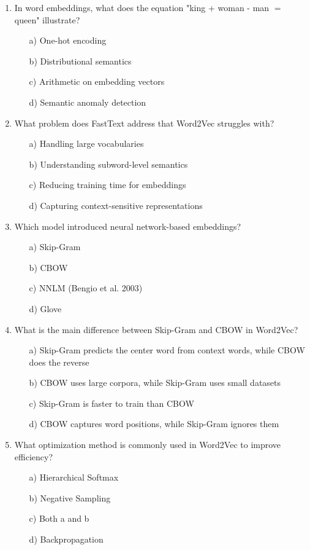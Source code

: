 \documentclass[8pt]{extarticle}
\begin{document}
\begin{multicols}{2}
\begin{enumerate}
\item In word embeddings, what does the equation "king + woman - man $=$ queen" illustrate?
\begin{itemize}
\item[a)] One-hot encoding
\item[b)] Distributional semantics
\item[c)] Arithmetic on embedding vectors
\item[d)] Semantic anomaly detection
\end{itemize}

\item What problem does FastText address that Word2Vec struggles with?
\begin{itemize}
\item[a)] Handling large vocabularies
\item[b)] Understanding subword-level semantics
\item[c)] Reducing training time for embeddings
\item[d)] Capturing context-sensitive representations
\end{itemize}

\item Which model introduced neural network-based embeddings?
\begin{itemize}
\item[a)] Skip-Gram
\item[b)] CBOW
\item[c)] NNLM (Bengio et al. 2003)
\item[d)] Glove
\end{itemize}

\item What is the main difference between Skip-Gram and CBOW in Word2Vec?
\begin{itemize}
\item[a)] Skip-Gram predicts the center word from context words, while CBOW does the reverse
\item[b)] CBOW uses large corpora, while Skip-Gram uses small datasets
\item[c)] Skip-Gram is faster to train than CBOW
\item[d)] CBOW captures word positions, while Skip-Gram ignores them
\end{itemize}

\item What optimization method is commonly used in Word2Vec to improve efficiency?
\begin{itemize}
\item[a)] Hierarchical Softmax
\item[b)] Negative Sampling
\item[c)] Both a and b
\item[d)] Backpropagation
\end{itemize}


\end{enumerate}
\end{multicols}
\end{document}
